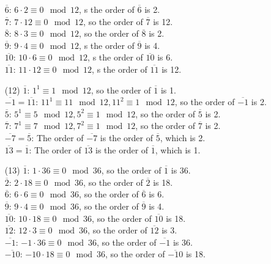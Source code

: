 \documentclass[12pt]{article}
\begin{document}
\begin{itemize}
$\overline{6}$: $6 \cdot 2 \equiv 0 \mod 12$, s the order of $\overline{6}$ is 2. \\
$\overline{7}$: $7 \cdot 12 \equiv 0 \mod 12$, so the order of $\overline{7}$ is 12. \\
$\overline{8}$: $8 \cdot 3 \equiv 0 \mod 12$, so the order of $\overline{8}$ is 2. \\
$\overline{9}$: $9 \cdot 4 \equiv 0 \mod 12$, s the order of $\overline{9}$ is 4. \\
$\overline{10}$: $10 \cdot 6 \equiv 0 \mod 12$, s the order of $\overline{10}$ is 6. \\
$\overline{11}$: $11 \cdot 12 \equiv 0 \mod 12$, s the order of $\overline{11}$ is 12.
\item[(12)]
$\overline{1}$: $1^1 \equiv 1 \mod 12$, so the order of $\overline{1}$ is 1.\\
$\overline{-1} = \overline{11}$: $11^1 \equiv 11 \mod 12, 11^2 \equiv 1 \mod 12$, so the order of $\overline{-1}$ is 2. \\
$\overline{5}$: $5^1 \equiv 5 \mod 12, 5^2 \equiv 1 \mod 12$, so the order of $\overline{5}$ is 2.\\
$\overline{7}$: $7^1 \equiv 7 \mod 12, 7^2 \equiv 1 \mod 12$, so the order of $\overline{7}$ is 2.\\
$\overline{-7} = \overline{5}$: The order of $\overline{-7}$ is the order of $\overline{5}$, which is 2.\\
$\overline{13} = \overline{1}$: The order of $\overline{13}$ is the order of $\overline{1}$, which is 1. 
\item[(13)]
$\overline{1}$: $1 \cdot 36 \equiv 0 \mod 36$, so the order of $\overline{1}$ is 36. \\
$\overline{2}$: $2 \cdot 18 \equiv 0 \mod 36$, so the order of $\overline{2}$ is 18.\\
$\overline{6}$: $6 \cdot 6 \equiv 0 \mod 36$, so the order of $\overline{6}$ is 6.\\
$\overline{9}$: $9 \cdot 4 \equiv 0 \mod 36$, so the order of $\overline{9}$ is 4.\\
$\overline{10}$: $10 \cdot 18 \equiv 0 \mod 36$, so the order of $\overline{10}$ is 18. \\ 
$\overline{12}$: $12 \cdot 3 \equiv 0 \mod 36$, so the order of $\overline{12}$ is 3.\\
$\overline{-1}$: $-1 \cdot 36 \equiv 0 \mod 36$, so the order of $\overline{-1}$ is 36.\\
$\overline{-10}$: $-10 \cdot 18 \equiv 0 \mod 36$, so the order of $\overline{-10}$ is 18.\\

\end{itemize}
\end{document}
